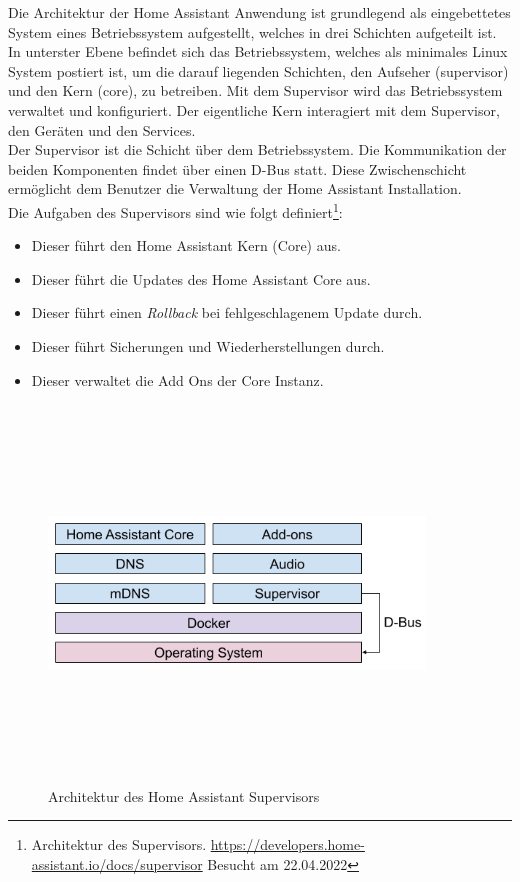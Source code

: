     Die Architektur der Home Assistant Anwendung ist grundlegend als eingebettetes System eines Betriebssystem aufgestellt, welches in 
    drei Schichten aufgeteilt ist. In unterster Ebene befindet sich das Betriebssystem, welches als minimales Linux System postiert 
    ist, um die darauf liegenden Schichten, den Aufseher (supervisor) und den Kern (core), zu betreiben. Mit dem Supervisor wird das 
    Betriebssystem verwaltet und konfiguriert. Der eigentliche Kern interagiert mit dem Supervisor, den Geräten und den Services. 
    \\
    \linebreak
    Der Supervisor ist die Schicht über dem Betriebssystem. Die Kommunikation der beiden Komponenten findet über einen D-Bus statt. Diese Zwischenschicht ermöglicht dem 
    Benutzer die Verwaltung der Home Assistant Installation. 
    \\
    Die Aufgaben des Supervisors sind wie folgt 
    definiert\footnote{Architektur des Supervisors. \url{https://developers.home-assistant.io/docs/supervisor} Besucht am 22.04.2022}: 
    \begin{itemize}
        \item Dieser führt den Home Assistant Kern (Core) aus.
        \item Dieser führt die Updates des Home Assistant Core aus.
        \item Dieser führt einen \textit{Rollback} bei fehlgeschlagenem Update durch.
        \item Dieser führt Sicherungen und Wiederherstellungen durch.
        \item Dieser verwaltet die Add Ons der Core Instanz.
    \end{itemize}
    \begin{figure}[hbt!]
        \centering
        \includegraphics[width=10cm,height=10cm,keepaspectratio]{images/ha_architecture_2020.png}
        \caption{Architektur des Home Assistant Supervisors \cite{haos-supervisor}}
        \label{fig:architectureHAOS}
    \end{figure}
